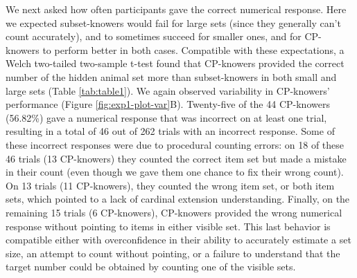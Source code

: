 \documentclass[
  man,floatsintext]{apa7}
\begin{document}
We next asked how often participants gave the correct numerical response. Here we expected subset-knowers would fail for large sets (since they generally can't count accurately), and to sometimes succeed for smaller ones, and for CP-knowers to perform better in both cases. Compatible with these expectations, a Welch two-tailed two-sample t-test found that CP-knowers provided the correct number of the hidden animal set more than subset-knowers in both small and large sets (Table \ref{tab:table1}). We again observed variability in CP-knowers' performance (Figure \ref{fig:exp1-plot-var}B).
Twenty-five of the 44 CP-knowers (56.82\%) gave a numerical response that was incorrect on at least one trial, resulting in a total of 46 out of 262 trials with an incorrect response.
Some of these incorrect responses were due to procedural counting errors: on 18 of these 46 trials (13 CP-knowers) they counted the correct item set but made a mistake in their count (even though we gave them one chance to fix their wrong count).
On 13 trials (11 CP-knowers), they counted the wrong item set, or both item sets, which pointed to a lack of cardinal extension understanding.
Finally, on the remaining 15 trials (6 CP-knowers), CP-knowers provided the wrong numerical response without pointing to items in either visible set. This last behavior is compatible either with overconfidence in their ability to accurately estimate a set size, an attempt to count without pointing, or a failure to understand that the target number could be obtained by counting one of the visible sets.
\end{document}
